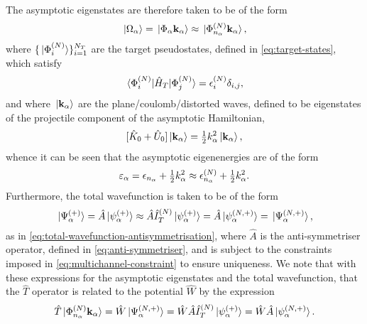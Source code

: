 \documentclass[draft]{article}
\begin{document}
The asymptotic eigenstates are therefore taken to be of the form
\begin{equation}
  \label{eq:ccc-asymptotic-states}
  \ket*{\Omega_{\alpha}}
  =
  \ket*{\Phi_{\alpha} \vb{k}_{\alpha}}
  \approx
  \ket*{\Phi_{n_{\alpha}}^{(N)} \vb{k}_{\alpha}}
  ,
\end{equation}
where $\lbrace\ket*{\Phi_{i}^{(N)}}\rbrace_{i = 1}^{N_{T}}$ are the target
pseudostates, defined in \autoref{eq:target-states}, which satisfy
\begin{equation}
  \label{eq:ccc-target}
  \mel*
  {\Phi_{i}^{(N)}}
  {\hat{H}_{T}}
  {\Phi_{j}^{(N)}}
  =
  \epsilon_{i}^{(N)}
  \delta_{i, j}
  ,
\end{equation}
and where $\ket*{\vb{k}_{\alpha}}$ are the plane/coulomb/distorted waves,
defined to be eigenstates of the projectile component of the asymptotic
Hamiltonian,
\begin{equation}
  \label{eq:ccc-waves}
  [
    \hat{K}_{0}
    +
    \hat{U}_{0}
  ]
  \ket*{\vb{k}_{\alpha}}
  =
  \tfrac{1}{2}
  k_{\alpha}^{2}
  \ket*{\vb{k}_{\alpha}}
  ,
\end{equation}
whence it can be seen that the asymptotic eigenenergies are of the form
\begin{equation}
  \label{eq:ccc-asymptotic-energy}
  \varepsilon_{\alpha}
  =
  \epsilon_{n_{\alpha}}
  +
  \tfrac{1}{2}
  k_{\alpha}^{2}
  \approx
  \epsilon_{n_{\alpha}}^{(N)}
  +
  \tfrac{1}{2}
  k_{\alpha}^{2}
  .
\end{equation}
Furthermore, the total wavefunction is taken to be of the form
\begin{equation}
  \label{eq:ccc-total-wavefunction}
  \ket*{\Psi_{\alpha}^{(+)}}
  =
  \hat{A}
  \ket*{\psi_{\alpha}^{(+)}}
  \approx
  \hat{A}
  \hat{I}_{T}^{(N)}
  \ket*{\psi_{\alpha}^{(+)}}
  =
  \hat{A}
  \ket*{\psi_{\alpha}^{(N, +)}}
  =
  \ket*{\Psi_{\alpha}^{(N, +)}}
  ,
\end{equation}
as in \autoref{eq:total-wavefunction-antisymmetrisation}, where $\hat{A}$ is the
anti-symmetriser operator, defined in \autoref{eq:anti-symmetriser}, and is
subject to the constraints imposed in \autoref{eq:multichannel-constraint} to
ensure uniqueness.
We note that with these expressions for the asymptotic eigenstates and the total
wavefunction, that the $\hat{T}$ operator is related to the potential $\hat{W}$
by the expression
\begin{equation}
  \label{eq:ccc-t-w}
  \hat{T}
  \ket*{\Phi_{n_{\alpha}}^{(N)} \vb{k}_{\alpha}}
  =
  \hat{W}
  \ket*{\Psi_{\alpha}^{(N, +)}}
  =
  \hat{W}
  \hat{A}
  \hat{I}_{T}^{(N)}
  \ket*{\psi_{\alpha}^{(+)}}
  =
  \hat{W}
  \hat{A}
  \ket*{\psi_{\alpha}^{(N, +)}}
  .
\end{equation}
\end{document}
